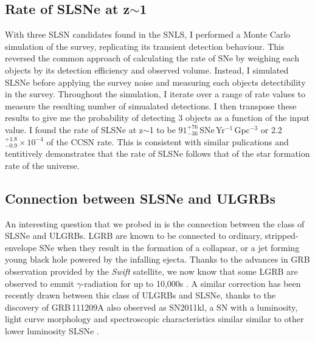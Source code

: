 \subsection{Rate of SLSNe at z$\sim$1}
With three SLSN candidates found in the SNLS, I performed a Monte Carlo simulation of the survey, replicating its transient detection behaviour. This reversed the common approach of calculating the rate of SNe by weighing each objects by its detection efficiency and observed volume. Instead, I simulated SLSNe before applying the survey noise and measuring each objects detectibility in the survey. Throughout the simulation, I iterate over a range of rate values to measure the resulting number of simualated detections. I then transpose these results to give me the probability of detecting 3 objects as a function of the input value. I found the rate of SLSNe at z$\sim$1 to be $91^{+76}_{-36}$\,SNe\,Yr$^{-1}$\,Gpc$^{-3}$ or 2.2$^{+1.8}_{-0.9}\times10^{-4}$ of the CCSN rate. This is consistent with similar pulications and tentitively demonstrates that the rate of SLSNe follows that of the star formation rate of the universe.

\subsection{Connection between SLSNe and ULGRBs}
An interesting question that we probed in \citet{Prajs2016} is the connection between the class of SLSNe and ULGRBs. LGRB are known to be connected to ordinary, stripped-envelope SNe when they result in the formation of a collapsar, or a jet forming young black hole powered by the infalling ejecta. Thanks to the advances in GRB observation provided by the \textit{Swift} satellite, we now know that some LGRB are observed to emmit $\gamma$-radiation for up to 10,000s \citep{Levan2013a}. A similar correction has been recently drawn between this class of ULGRBs and SLSNe, thanks to the discovery of GRB\,111209A also observed as SN2011kl, a SN with a luminosity, light curve morphology and spectroscopic characteristics similar similar to other lower luminosity SLSNe \citep{Greiner2015}.

